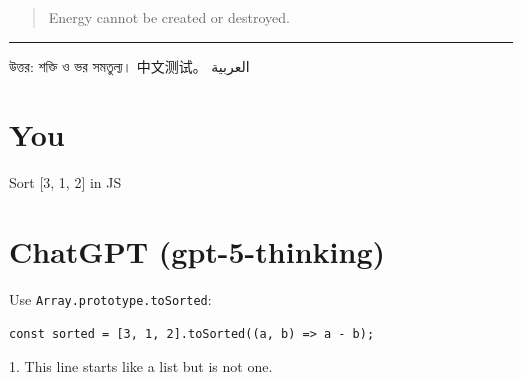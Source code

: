\documentclass[11pt,a4paper]{article}
\begin{document}
\begin{center}
\end{center}

\begin{quote}
Energy cannot be created or destroyed.

\end{quote}

\noindent\rule{\linewidth}{0.4pt}


উত্তর: শক্তি ও ভর সমতুল্য। 中文测试。 العربية


\section*{You}


Sort [3, 1, 2] in JS


\section*{ChatGPT (gpt-5-thinking)}

Use \texttt{Array.prototype.toSorted}:

\begin{lstlisting}
const sorted = [3, 1, 2].toSorted((a, b) => a - b);
\end{lstlisting}

1. This line starts like a list but is not one.
\end{document}
